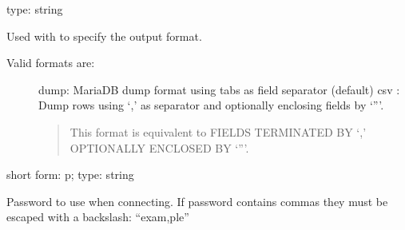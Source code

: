 \documentclass[letterpaper,10pt,english]{sphinxmanual}
\begin{document}

\begin{fulllineitems}
\label{\detokenize{mariadb-archiver:cmdoption-mariadb-archiver-output-format}}
type: string

Used with {\hyperref[\detokenize{mariadb-archiver:cmdoption-mariadb-archiver-file}]{}} to specify the output format.
\begin{description}
\item[{Valid formats are:}] \leavevmode
dump: MariaDB dump format using tabs as field separator (default)
csv : Dump rows using ‘,’ as separator and optionally enclosing fields by ‘”’.
\begin{quote}

This format is equivalent to FIELDS TERMINATED BY ‘,’ OPTIONALLY ENCLOSED BY ‘”’.
\end{quote}

\end{description}

\end{fulllineitems}


\begin{fulllineitems}
\label{\detokenize{mariadb-archiver:cmdoption-mariadb-archiver-password}}
short form: \sphinxhyphen{}p; type: string

Password to use when connecting.
If password contains commas they must be escaped with a backslash: “exam,ple”

\end{fulllineitems}
\end{document}
